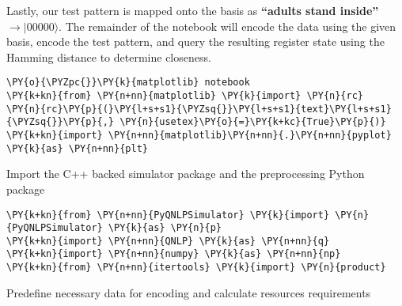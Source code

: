 Lastly, our test pattern is mapped onto the basis as \textbf{``adults
stand inside''} \(\rightarrow |00000\rangle\). The remainder of the
notebook will encode the data using the given basis, encode the test
pattern, and query the resulting register state using the Hamming
distance to determine closeness.

    \begin{tcolorbox}[breakable, size=fbox, boxrule=1pt, pad at break*=1mm,colback=cellbackground, colframe=cellborder]
\begin{Verbatim}[commandchars=\\\{\}]
\PY{o}{\PYZpc{}}\PY{k}{matplotlib} notebook
\PY{k+kn}{from} \PY{n+nn}{matplotlib} \PY{k}{import} \PY{n}{rc}
\PY{n}{rc}\PY{p}{(}\PY{l+s+s1}{\PYZsq{}}\PY{l+s+s1}{text}\PY{l+s+s1}{\PYZsq{}}\PY{p}{,} \PY{n}{usetex}\PY{o}{=}\PY{k+kc}{True}\PY{p}{)}
\PY{k+kn}{import} \PY{n+nn}{matplotlib}\PY{n+nn}{.}\PY{n+nn}{pyplot} \PY{k}{as} \PY{n+nn}{plt}
\end{Verbatim}
\end{tcolorbox}

    Import the C++ backed simulator package and the preprocessing Python
package

    \begin{tcolorbox}[breakable, size=fbox, boxrule=1pt, pad at break*=1mm,colback=cellbackground, colframe=cellborder]
\begin{Verbatim}[commandchars=\\\{\}]
\PY{k+kn}{from} \PY{n+nn}{PyQNLPSimulator} \PY{k}{import} \PY{n}{PyQNLPSimulator} \PY{k}{as} \PY{n}{p}
\PY{k+kn}{import} \PY{n+nn}{QNLP} \PY{k}{as} \PY{n+nn}{q}
\PY{k+kn}{import} \PY{n+nn}{numpy} \PY{k}{as} \PY{n+nn}{np}
\PY{k+kn}{from} \PY{n+nn}{itertools} \PY{k}{import} \PY{n}{product}
\end{Verbatim}
\end{tcolorbox}

    Predefine necessary data for encoding and calculate resources
requirements

